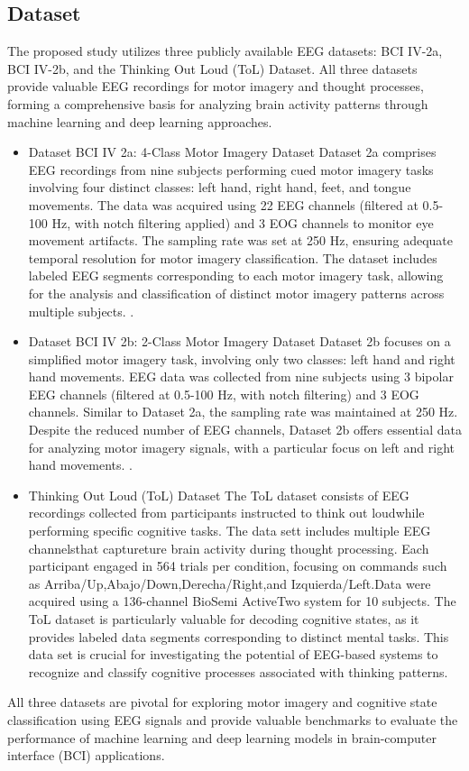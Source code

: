 \documentclass[pdflatex,sn-mathphys-num]{sn-jnl}
\theoremstyle{thmstyleone}%
\theoremstyle{thmstyletwo}%
\theoremstyle{thmstylethree}%
\begin{document}
\subsection{Dataset}
The proposed study utilizes three publicly available EEG datasets: BCI IV-2a, BCI
IV-2b, and the Thinking Out Loud (ToL) Dataset. All three datasets provide valuable
EEG recordings for motor imagery and thought processes, forming a comprehensive
basis for analyzing brain activity patterns through machine learning and deep learning
approaches.

\begin{itemize}
\item Dataset BCI IV 2a: 4-Class Motor Imagery Dataset
Dataset 2a comprises EEG recordings from nine subjects performing cued motor
imagery tasks involving four distinct classes: left hand, right hand, feet, and tongue
movements. The data was acquired using 22 EEG channels (filtered at 0.5-100 Hz,
with notch filtering applied) and 3 EOG channels to monitor eye movement artifacts. The sampling rate was set at 250 Hz, ensuring adequate temporal resolution
for motor imagery classification. The dataset includes labeled EEG segments corresponding to each motor imagery task, allowing for the analysis and classification of
distinct motor imagery patterns across multiple subjects. \cite{tangermann2012review}.
\item Dataset BCI IV 2b: 2-Class Motor Imagery Dataset
Dataset 2b focuses on a simplified motor imagery task, involving only two classes:
left hand and right hand movements. EEG data was collected from nine subjects
using 3 bipolar EEG channels (filtered at 0.5-100 Hz, with notch filtering) and 3
EOG channels. Similar to Dataset 2a, the sampling rate was maintained at 250
Hz. Despite the reduced number of EEG channels, Dataset 2b offers essential data
for analyzing motor imagery signals, with a particular focus on left and right hand
movements. \cite{leeb2008graz2b}.
\item Thinking Out Loud (ToL) Dataset
The ToL dataset consists of EEG recordings collected from participants instructed
to \textquotesingle think out loud\textquotesingle while performing specific cognitive tasks. The data sett includes
multiple EEG channelsthat captureture brain activity during thought processing.
Each participant engaged in 564 trials per condition, focusing on commands such as
\textquotesingle Arriba/Up,\textquotesingle \textquotesingle Abajo/Down,\textquotesingle \textquotesingle Derecha/Right,\textquotesingle and \textquotesingle Izquierda/Left.\textquotesingle Data were
acquired using a 136-channel BioSemi ActiveTwo system for 10 subjects. The ToL
dataset is particularly valuable for decoding cognitive states, as it provides labeled
data segments corresponding to distinct mental tasks. This data set is crucial for
investigating the potential of EEG-based systems to recognize and classify cognitive
processes associated with thinking patterns.\cite{nieto2022thinking}
\end{itemize}
All three datasets are pivotal for exploring motor imagery and cognitive state
classification using EEG signals and provide valuable benchmarks to evaluate the
performance of machine learning and deep learning models in brain-computer interface
(BCI) applications.
\end{document}
